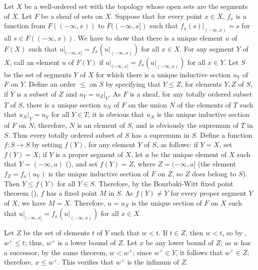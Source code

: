 \documentclass{article}
\begin{document}
\begin{solution}
  \label{sol:uutctwo0}
  Let \(X\) be a well-ordered set with the topology whose open sets
  are the segments of \(X\).  Let \(F\) be a sheaf of sets on \(X\).
  Suppose that for every point \(x \in X\), \(f_x\) is a function from
  \(F((-\infty, x))\) to \(F((-\infty, x])\) such that
  \(f_x(s) \vert_{(-\infty, x)} = s\) for all
  \(s \in F((-\infty, x))\).  We have to show that there is a unique
  element \(u\) of \(F(X)\) such that
  \(u \vert_{(-\infty, x]} = f_x(u \vert_{(-\infty, x)})\) for all
  \(x \in X\).  For any segment \(Y\) of \(X\), call an element \(u\)
  of \(F(Y)\)  if
  \(u \vert_{(-\infty, x]} = f_x(u \vert_{(-\infty, x)})\) for all
  \(x \in Y\).  Let \(S\) be the set of segments \(Y\) of \(X\) for
  which there is a unique inductive section \(u_Y\) of \(F\) on \(Y\).
  Define an order \(\leq\) on \(S\) by specifying that \(Y \leq Z\),
  for elements \(Y, Z\) of \(S\), if \(Y\) is a subset of \(Z\) and
  \(u_Y = u_Z \vert_Y\).  As \(F\) is a sheaf, for any totally ordered
  subset \(T\) of \(S\), there is a unique section \(u_N\) of \(F\) on
  the union \(N\) of the elements of \(T\) such that
  \(u_N \vert_Y = u_Y\) for all \(Y \in T\); it is obvious that
  \(u_N\) is the unique inductive section of \(F\) on \(N\);
  therefore, \(N\) is an element of \(S\), and is obviously the
  supremum of \(T\) in \(S\).  Thus every totally ordered subset of
  \(S\) has a supremum in \(S\).  Define a function \(f : S \to S\) by
  setting \(f(Y)\), for any element \(Y\) of \(S\), as follows: if
  \(Y = X\), set \(f(Y) = X\); if \(Y\) is a proper segment of \(X\),
  let \(a\) be the unique element of \(X\) such that
  \(Y = (-\infty, a)\) (), and set \(f(Y) = Z\),
  where \(Z = (-\infty, a]\) (the element \(f_Z = f_a(u_Y)\) is the
  unique inductive section of \(F\) on \(Z\), so \(Z\) does belong to
  \(S\)).  Then \(Y \leq f(Y)\) for all \(Y \in S\).  Therefore, by
  the Bourbaki-Witt fixed point theorem (), \(f\)
  has a fixed point \(M\) in \(S\).  As \(f(Y) \neq Y\) for every
  proper segment \(Y\) of \(X\), we have \(M = X\).  Therefore,
  \(u = u_X\) is the unique section of \(F\) on \(X\) such that
  \(u \vert_{(-\infty, x]} = f_x(u \vert_{(-\infty, x)})\) for all
  \(x \in X\).
\end{solution}

\begin{solution}[\ref{exe:ylp1zcc8}]
  \label{sol:6szduuuo}
  Let \(Z\) be the set of elements \(t\) of \(Y\) such that \(w < t\).
  If \(t \in Z\), then \(w < t\), so by ,
  \(w^+ \leq t\); thus, \(w^+\) is a lower bound of \(Z\).  Let \(x\)
  be any lower bound of \(Z\); as \(w\) has a successor, by the same
  theorem, \(w < w^+\); since \(w^+ \in Y\), it follows that
  \(w^+ \in Z\); therefore, \(x \leq w^+\).  This verifies that
  \(w^+\) is the infimum of \(Z\).
\end{solution}
\end{document}
